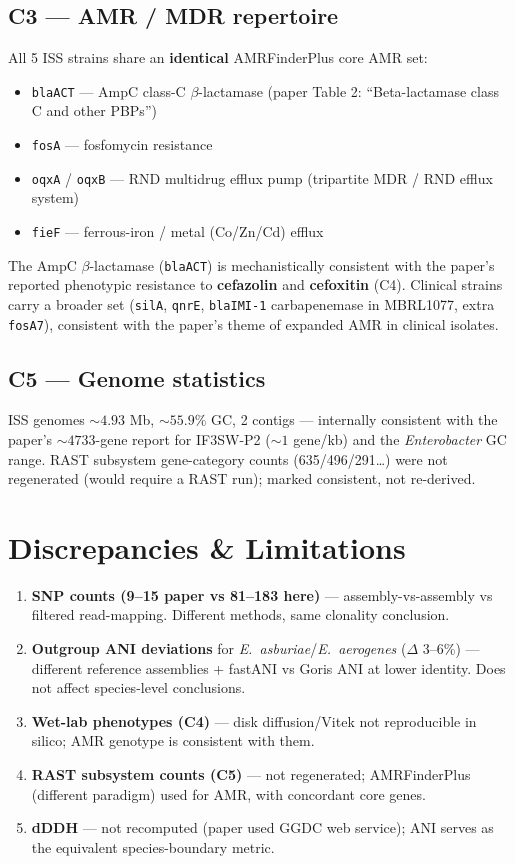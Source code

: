 \documentclass[11pt]{article}
\begin{document}
\subsection{C3 --- AMR / MDR repertoire}
All 5 ISS strains share an \textbf{identical} AMRFinderPlus core AMR set:
\begin{itemize}[leftmargin=1.3em]
  \item \texttt{blaACT} --- AmpC class-C $\beta$-lactamase (paper Table 2: ``Beta-lactamase class C and other PBPs'')
  \item \texttt{fosA}   --- fosfomycin resistance
  \item \texttt{oqxA} / \texttt{oqxB} --- RND multidrug efflux pump (tripartite MDR / RND efflux system)
  \item \texttt{fieF}   --- ferrous-iron / metal (Co/Zn/Cd) efflux
\end{itemize}
The AmpC $\beta$-lactamase (\texttt{blaACT}) is mechanistically consistent with the paper's reported
phenotypic resistance to \textbf{cefazolin} and \textbf{cefoxitin} (C4). Clinical strains carry a broader
set (\texttt{silA}, \texttt{qnrE}, \texttt{blaIMI-1} carbapenemase in MBRL1077, extra \texttt{fosA7}),
consistent with the paper's theme of expanded AMR in clinical isolates.

\subsection{C5 --- Genome statistics}
ISS genomes ${\sim}4.93$ Mb, ${\sim}55.9\%$ GC, 2 contigs --- internally consistent with the paper's
${\sim}4733$-gene report for IF3SW-P2 (${\sim}1$ gene/kb) and the \textit{Enterobacter} GC range.
RAST subsystem gene-category counts (635/496/291\ldots) were not regenerated
(would require a RAST run); marked consistent, not re-derived.

\section{Discrepancies \& Limitations}
\begin{enumerate}[leftmargin=1.5em]
  \item \textbf{SNP counts (9--15 paper vs 81--183 here)} --- assembly-vs-assembly vs filtered read-mapping.
        Different methods, same clonality conclusion.
  \item \textbf{Outgroup ANI deviations} for \textit{E.~asburiae}/\textit{E.~aerogenes} ($\Delta$ 3--6\%)
        --- different reference assemblies + fastANI vs Goris ANI at lower identity.
        Does not affect species-level conclusions.
  \item \textbf{Wet-lab phenotypes (C4)} --- disk diffusion/Vitek not reproducible in silico;
        AMR genotype is consistent with them.
  \item \textbf{RAST subsystem counts (C5)} --- not regenerated; AMRFinderPlus (different paradigm)
        used for AMR, with concordant core genes.
  \item \textbf{dDDH} --- not recomputed (paper used GGDC web service); ANI serves as the equivalent
        species-boundary metric.
\end{enumerate}
\end{document}
